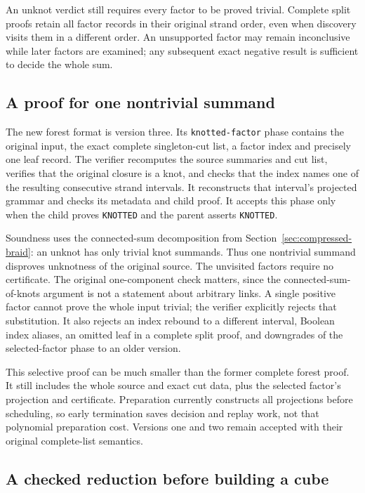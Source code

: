 An unknot verdict still requires every factor to be proved trivial. Complete
split proofs retain all factor records in their original strand order, even
when discovery visits them in a different order. An unsupported factor may
remain inconclusive while later factors are examined; any subsequent exact
negative result is sufficient to decide the whole sum.

\subsection{A proof for one nontrivial summand}

The new forest format is version three. Its \texttt{knotted-factor} phase
contains the original input, the exact complete singleton-cut list, a factor
index and precisely one leaf record. The verifier recomputes the source
summaries and cut list, verifies that the original closure is a knot, and
checks that the index names one of the resulting consecutive strand intervals.
It reconstructs that interval's projected grammar and checks its metadata and
child proof. It accepts this phase only when the child proves
\texttt{KNOTTED} and the parent asserts \texttt{KNOTTED}.

Soundness uses the connected-sum decomposition from
Section~\ref{sec:compressed-braid}: an unknot has only trivial knot summands.
Thus one nontrivial summand disproves unknotness of the original source.
The unvisited factors require no certificate. The original one-component
check matters, since the connected-sum-of-knots argument is not a statement
about arbitrary links. A single positive factor cannot prove the whole input
trivial; the verifier explicitly rejects that substitution. It also rejects
an index rebound to a different interval, Boolean index aliases, an omitted
leaf in a complete split proof, and downgrades of the selected-factor phase
to an older version.

This selective proof can be much smaller than the former complete forest
proof. It still includes the whole source and exact cut data, plus the
selected factor's projection and certificate. Preparation currently constructs
all projections before scheduling, so early termination saves decision and
replay work, not that polynomial preparation cost. Versions one and two remain
accepted with their original complete-list semantics.

\subsection{A checked reduction before building a cube}

